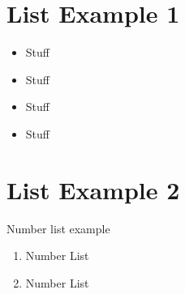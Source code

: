 
\section{List Example 1}


\begin{itemize}
\itemsep-0.5em 
  \item Stuff
  \item Stuff
  \item Stuff
  \item Stuff
\end{itemize}

\section{List Example 2}

Number list example

\begin{enumerate} 
    \item Number List
    \item Number List
\end{enumerate}